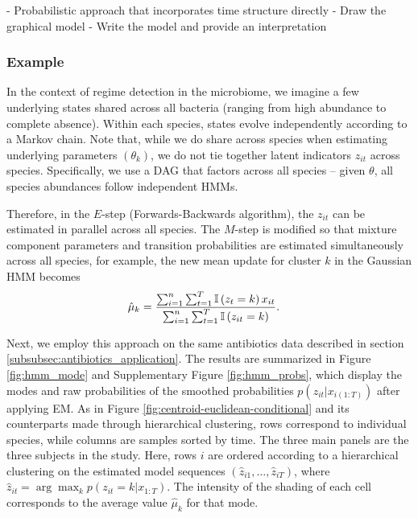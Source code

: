 \documentclass{article}
\begin{document}
- Probabilistic approach that incorporates time structure directly
- Draw the graphical model
- Write the model and provide an interpretation

\subsubsection{Example}
\label{subsubsec:hmm_example}

In the context of regime detection in the microbiome, we imagine a few
underlying states shared across all bacteria (ranging from high abundance to
complete absence). Within each species, states evolve independently according to
a Markov chain. Note that, while we do share across species when estimating
underlying parameters $\left(\theta_{k}\right)$, we do not tie together latent
indicators $z_{it}$ across species. Specifically, we use a DAG that factors
across all species -- given $\theta$, all species abundances follow independent
HMMs.

Therefore, in the $E$-step (Forwards-Backwards algorithm), the $z_{it}$ can be
estimated in parallel across all species. The $M$-step is modified so that
mixture component parameters and transition probabilities are estimated
simultaneously across all species, for example, the new mean update for cluster
$k$ in the Gaussian HMM becomes
\begin{align*}
\hat{\mu}_{k} &= \frac{\sum_{i = 1}^{n}\sum_{t = 1}^{T} \mathbb{I}\left({z_{t} = k}\right)x_{it}}{\sum_{i = 1}^{n}\sum_{t = 1}^{T} \mathbb{I}\left({z_{it} = k}\right)}.
\end{align*}

Next, we employ this approach on the same antibiotics data described in section
\ref{subsubsec:antibiotics_application}. The results are summarized in Figure
\ref{fig:hmm_mode} and Supplementary Figure \ref{fig:hmm_probs}, which display
the modes and raw probabilities of the smoothed probabilities $p\left(z_{it}
\vert x_{i(1:T)}\right)$ after applying EM. As in Figure
\ref{fig:centroid-euclidean-conditional} and its counterparts made through
hierarchical clustering, rows correspond to individual species, while columns
are samples sorted by time. The three main panels are the three subjects in the
study. Here, rows $i$ are ordered according to a hierarchical clustering on the
estimated model sequences $\left(\hat{z}_{i1}, \dots, \hat{z}_{iT}\right)$,
where $\hat{z}_{it} = \arg \max_{k} p\left(z_{it} = k \vert x_{1:T}\right)$. The
intensity of the shading of each cell corresponds to the average value
$\hat{\mu}_{k}$ for that mode.
\end{document}
